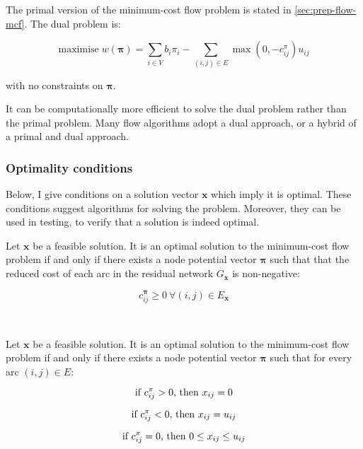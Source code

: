 The primal version of the minimum-cost flow problem is stated in \ref{sec:prep-flow-mcf}.
The dual problem is:

\begin{equation}
\mathrm{maximise}\; w(\boldsymbol{\pi})=\sum_{i\in V}b_{i}\pi_{i}-\sum_{(i,j)\in E}\max\left(0,-c_{ij}^{\pi}\right)u_{ij}
\end{equation}

with no constraints on $\boldsymbol{\pi}$.

It can be computationally more efficient to solve the dual problem
rather than the primal problem. Many flow algorithms adopt a dual
approach, or a hybrid of a primal and dual approach.

\subsubsection{Optimality conditions}

Below, I give conditions on a solution vector $\mathbf{x}$ which
imply it is optimal. These conditions suggest algorithms for solving
the problem. Moreover, they can be used in testing, to verify that
a solution is indeed optimal.\\

\begin{thm} \label{thm:optimality-reduced-cost}
Let $\mathbf{x}$ be a feasible solution. It is an optimal solution
to the minimum-cost flow problem if and only if there exists a node
potential vector $\boldsymbol{\pi}$ such that that the reduced cost
of each arc in the residual network $G_{\mathbf{x}}$ is non-negative:

\begin{equation} \label{eq:optimality-reduced-cost}
c_{ij}^{\boldsymbol{\pi}}\geq0\:\forall(i,j)\in E_{\mathbf{x}}
\end{equation}
\end{thm}

~ %

\begin{thm}
Let $\mathbf{x}$ be a feasible solution. It is an optimal solution
to the minimum-cost flow problem if and only if there exists a node
potential vector $\boldsymbol{\pi}$ such that for every arc $(i,j)\in E$:

\begin{equation}
\text{if \ensuremath{c_{ij}^{\pi}>0}, then \ensuremath{x_{ij}=0}}
\end{equation}

\begin{equation}
\text{if \ensuremath{c_{ij}^{\pi}<0}, then \ensuremath{x_{ij}=u_{ij}}}
\end{equation}

\begin{equation}
\text{if \ensuremath{c_{ij}^{\pi}=0}, then \ensuremath{0\leq x_{ij}\leq u_{ij}}}
\end{equation}
\end{thm}

